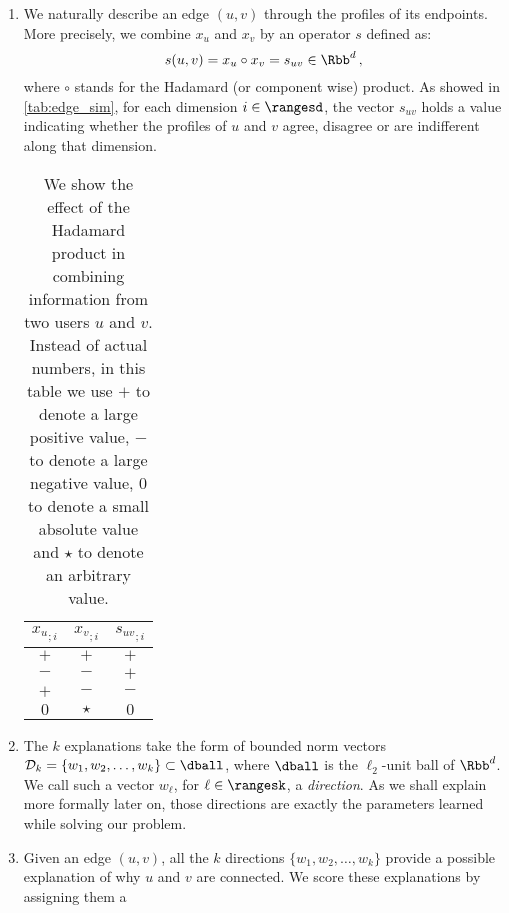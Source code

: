 \begin{enumerate}[1),nosep,leftmargin=*]
  \item We naturally describe an edge $(u,v)$ through the profiles of its endpoints. More precisely,
    we combine $x_u$ and $x_v$ by an operator $s$ defined as:
    \begin{equation*}
      s(u, v) = x_u \circ x_v = s_{uv} \in \Rbb^d \, ,
    \end{equation*}
    where $\circ$ stands for the Hadamard (or component wise) product. As showed in
    \autoref{tab:edge_sim}, for each dimension $i \in \rangesd$, the vector $s_{uv}$ holds a value
    indicating whether the profiles of $u$ and $v$ agree, disagree or are indifferent along that
    dimension.
    \begin{table}[hb]
      \centering
      \caption{\small We show the effect of the Hadamard product in combining information from two
        users $u$ and $v$. Instead of actual numbers, in this table we use $+$ to denote a large
        positive value, $-$ to denote a large negative value, $0$ to denote a small absolute value
        and $\star$ to denote an arbitrary value.
      \label{tab:edge_sim}}
      \begin{tabular}{ccc}
        \toprule
        ${x_u}_{;i}$ & ${x_v}_{;i}$ & ${s_{uv}}_{;i}$ \\
        \midrule
        $+$          & $+$          & $+$             \\
        $-$          & $-$          & $+$             \\
        $+$          & $-$          & $-$             \\
        $0$          & $\star$      & $0$             \\
        \bottomrule
      \end{tabular}
    \end{table}
  \item The $k$ explanations take the form of bounded norm vectors $\mathcal{D}_k = \{w_1, w_2,
    \ldots, w_k\} \subset \dball$, where $\dball$ is the $\ell_2$-unit ball of $\Rbb^d$. We call such a
    vector $w_\ell$, for $\ell \in \rangesk$, a \emph{direction}. As we shall explain more formally
    later on, those directions are exactly the parameters learned while solving our problem.
  \item Given an edge $(u,v)$, all the $k$ directions $\{w_1, w_2, \ldots, w_k\}$ provide a possible
    explanation of why $u$ and $v$ are connected. We score these explanations by assigning them a

\end{enumerate}
